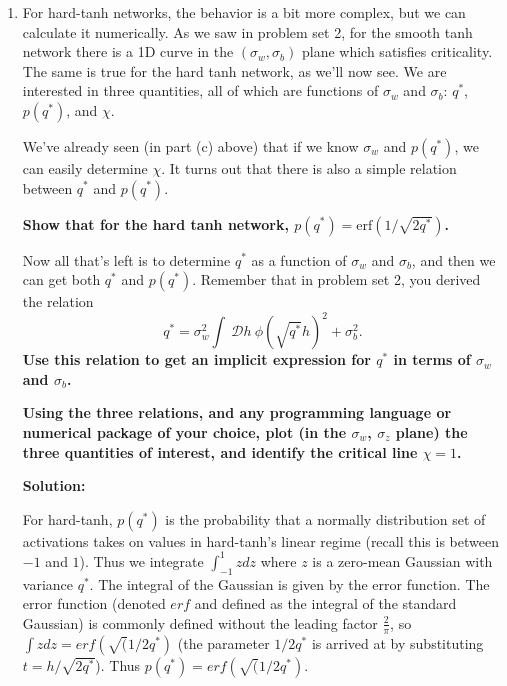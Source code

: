 \documentclass[a4paper]{article}
\begin{document}
\begin{enumerate}[label=(\alph*)]
\item For hard-tanh networks, the behavior is a bit more complex, but we can calculate it numerically.  As we saw in problem set 2, for the smooth tanh network there is a 1D curve in the $(\sigma_w, \sigma_b)$ plane which satisfies criticality.  The same is true for the hard tanh network, as we'll now see.  We are interested in three quantities, all of which are functions of $\sigma_w$ and $\sigma_b$:  $q^*$, $p(q^*)$, and $\chi$.  

We've already seen (in part (c) above) that if we know $\sigma_w$ and $p(q^*)$, we can easily determine $\chi$.  It turns out that there is also a simple relation between $q^*$ and $p(q^*)$. 

\textbf{Show that for the hard tanh network, $p(q^*) = \mathrm{erf}(1/\sqrt{2q^*})$.}

Now all that's left is to determine $q^*$ as a function of $\sigma_w$ and $\sigma_b$, and then we can get both $q^*$ and $p(q^*)$.  Remember that in problem set 2, you derived the relation 
\begin{equation}
q^* = \sigma_w^2 \int~ \mathcal{D}h~ \phi(\sqrt{q^*}h)^2 + \sigma_b^2.
\end{equation}
\textbf{Use this relation to get an implicit expression for $q^*$ in terms of $\sigma_w$ and $\sigma_b$.}

\textbf{Using the three relations, and any programming language or numerical package of your choice, plot (in the $\sigma_w$, $\sigma_z$ plane) the three quantities of interest, and identify the critical line $\chi = 1$.}


\begin{tcolorbox}
\textbf{Solution:}

For hard-tanh, $p(q^*)$ is the probability that a normally distribution set of activations takes on values in hard-tanh's linear regime (recall this is between $-1$ and $1$). Thus we integrate $\int_{-1}^{1} z dz$ where $z$ is a zero-mean Gaussian with variance $q^*$. The integral of the Gaussian is given by the error function. The error function (denoted $erf$ and defined as the integral of the standard Gaussian) is commonly defined without the leading factor $\frac{2}{\pi}$, so $\int z dz = erf(\sqrt(1/2q^*)$ (the parameter $1/2q^*$ is arrived at by substituting $t=h/\sqrt{2q^*}$). Thus $p(q^*) = erf(\sqrt(1/2q^*)$.
\end{tcolorbox}


\end{enumerate}
\end{document}
